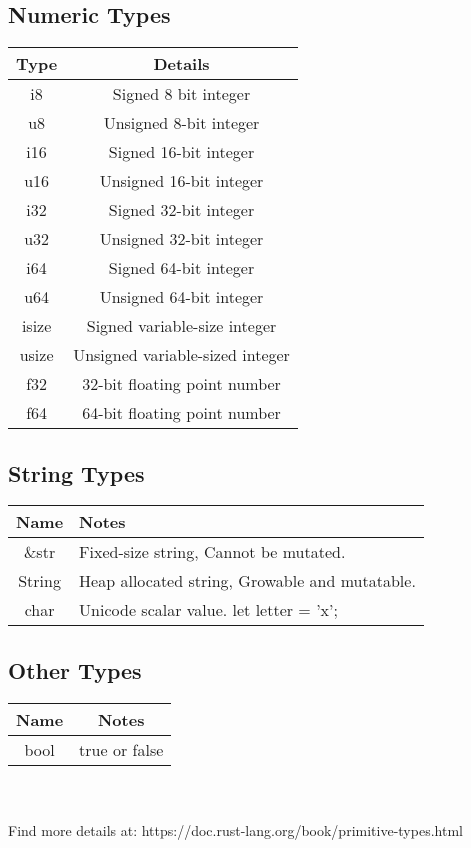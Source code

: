 \documentclass[letterpaper,landscape]{article}
\begin{document}
\begin{multicols}{3}
\subsection*{Numeric Types}
\begin{tabular}{ c|c }
  Type & Details \\
  \hline
    \color{BrickRed}i8 & Signed 8 bit integer \\
    \color{BrickRed}u8 & Unsigned 8-bit integer\\
    \color{BrickRed}i16 & Signed 16-bit integer\\
    \color{BrickRed}u16 & Unsigned 16-bit integer\\
    \color{BrickRed}i32 & Signed 32-bit integer \\
    \color{BrickRed}u32 & Unsigned 32-bit integer \\
    \color{BrickRed}i64 & Signed 64-bit integer \\
    \color{BrickRed}u64 & Unsigned 64-bit integer \\
    \hline\hline
    \color{BrickRed}isize & Signed variable-size integer \\ \color{BrickRed}usize & Unsigned variable-sized integer \\
    \hline\hline
    \color{BrickRed}f32 & 32-bit floating point number \\
    \color{BrickRed}f64 & 64-bit floating point number\\
\end{tabular}

\subsection*{String Types}
\begin{tabular}{ c|L }
  Name & Notes \\
  \hline
  \color{BrickRed}\&str & Fixed-size string, Cannot be mutated. \\
  \color{BrickRed}String & Heap allocated string, Growable and mutatable.\\
  \color{BrickRed}char & Unicode scalar value. let letter = 'x';\\
\end{tabular}

\subsection*{Other Types}
\begin{tabular}{ c|c }
  Name & Notes \\
  \hline
  \color{BrickRed}bool & true or false \\
\end{tabular}
\\\\
Find more details at: https://doc.rust-lang.org/book/primitive-types.html


\end{multicols}
\end{document}
